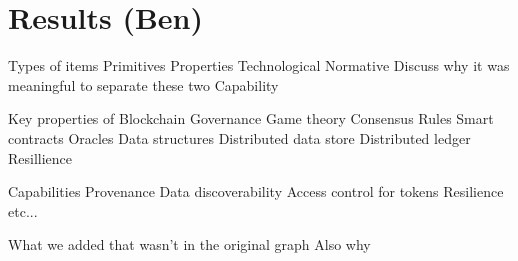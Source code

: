 \section{Results (Ben)}

Types of items
	Primitives
	Properties
		Technological
		Normative
		Discuss why it was meaningful to separate these two
	Capability

Key properties of Blockchain
	Governance
		Game theory
	Consensus
	Rules
		Smart contracts
		Oracles
	Data structures
		Distributed data store
		Distributed ledger
	Resillience

Capabilities
	Provenance
	Data discoverability
	Access control for tokens
	Resilience
	etc...
	
What we added that wasn't in the original graph
	Also why